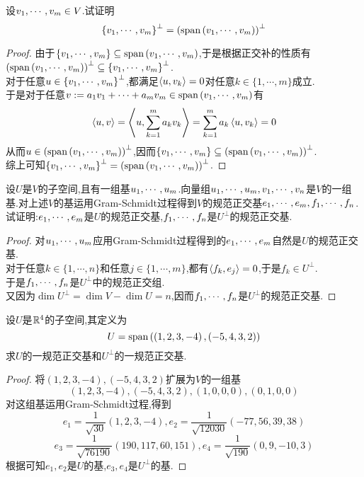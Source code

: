 \documentclass{ctexart}
\begin{document}
\pagestyle{empty}
\begin{center}
    \large{}
\end{center}
\begin{problem}[1.]
    设${v}_1,\cdots,{v}_{m}\in V$.试证明
    \[\left\{{v}_1,\cdots,{v}_{m}\right\}^{\bot}=\left(\text{span}\left({v}_1,\cdots,{v}_{m}\right)\right)^{\bot}\]
\end{problem}
\begin{proof}
    由于$\left\{{v}_1,\cdots,{v}_{m}\right\}\subseteq\text{span}\left({v}_1,\cdots,{v}_{m}\right)$,于是根据正交补的性质有$\left(\text{span}\left({v}_1,\cdots,{v}_{m}\right)\right)^{\bot}\subseteq\left\{{v}_1,\cdots,{v}_{m}\right\}^{\bot}$.\\
    对于任意$u\in\left\{{v}_1,\cdots,{v}_{m}\right\}^\bot$,都满足$\left\langle{u},{v_k}\right\rangle=0$对任意$k\in\{1,\cdots,m\}$成立.\\
    于是对于任意$v:=a_1v_1+\cdots+a_mv_m\in\text{span}\left({v}_1,\cdots,{v}_{m}\right)$有
    \[\left\langle{u},{v}\right\rangle=\left\langle{u},{\sum_{k=1}^{m}a_kv_k}\right\rangle=\sum_{k=1}^{m}a_k\left\langle{u},{v_k}\right\rangle=0\]
    从而$u\in\left(\text{span}\left({v}_1,\cdots,{v}_{m}\right)\right)^{\bot}$,因而$\left\{{v}_1,\cdots,{v}_{m}\right\}\subseteq\left(\text{span}\left({v}_1,\cdots,{v}_{m}\right)\right)^{\bot}$.\\
    综上可知$\left\{{v}_1,\cdots,{v}_{m}\right\}^{\bot}=\left(\text{span}\left({v}_1,\cdots,{v}_{m}\right)\right)^{\bot}$.
\end{proof}
\begin{problem}[2.]
    设$U$是$V$的子空间,且有一组基${u}_1,\cdots,{u}_{m}$.向量组${u}_1,\cdots,{u}_{m},{v}_1,\cdots,{v}_{n}$是$V$的一组基.对上述$V$的基运用Gram-Schmidt过程得到$V$的规范正交基${e}_1,\cdots,{e}_{m},{f}_1,\cdots,{f}_{n}$.试证明:${e}_1,\cdots,{e}_{m}$是$U$的规范正交基,${f}_1,\cdots,{f}_{n}$是$U^\bot$的规范正交基.
\end{problem}
\begin{proof}
    对${u}_1,\cdots,{u}_{m}$应用Gram-Schmidt过程得到的${e}_1,\cdots,{e}_{m}$自然是$U$的规范正交基.\\
    对于任意$k\in\{1,\cdots,n\}$和任意$j\in\{1,\cdots,m\}$,都有$\left\langle{f_k},{e_j}\right\rangle=0$,于是$f_k\in U^\bot$.\\
    于是${f}_1,\cdots,{f}_{n}$是$U^\bot$中的规范正交组.\\
    又因为$\dim U^\bot=\dim V-\dim U=n$,因而${f}_1,\cdots,{f}_{n}$是$U^\bot$的规范正交基.
\end{proof}
\begin{problem}[3.]
    设$U$是$\mathbb{R}^4$的子空间,其定义为
    \[U=\text{span}\left(\left(1,2,3,-4\right),\left(-5,4,3,2\right)\right)\]
    求$U$的一规范正交基和$U^\bot$的一规范正交基.
\end{problem}
\begin{proof}
    将$\left(1,2,3,-4\right),\left(-5,4,3,2\right)$扩展为$V$的一组基
    \[\left(1,2,3,-4\right),\left(-5,4,3,2\right),\left(1,0,0,0\right),(0,1,0,0)\]
    对这组基运用Gram-Schmidt过程,得到
    \[e_1=\dfrac{1}{\sqrt{30}}\left(1,2,3,-4\right),e_2=\dfrac{1}{\sqrt{12030}}\left(-77,56,39,38\right)\]
    \[e_3=\dfrac{1}{\sqrt{76190}}\left(190,117,60,151\right),e_4=\dfrac{1}{\sqrt{190}}\left(0,9,-10,3\right)\]
    根据可知$e_1,e_2$是$U$的基,$e_3,e_4$是$U^\bot$的基.
\end{proof}
\end{document}
